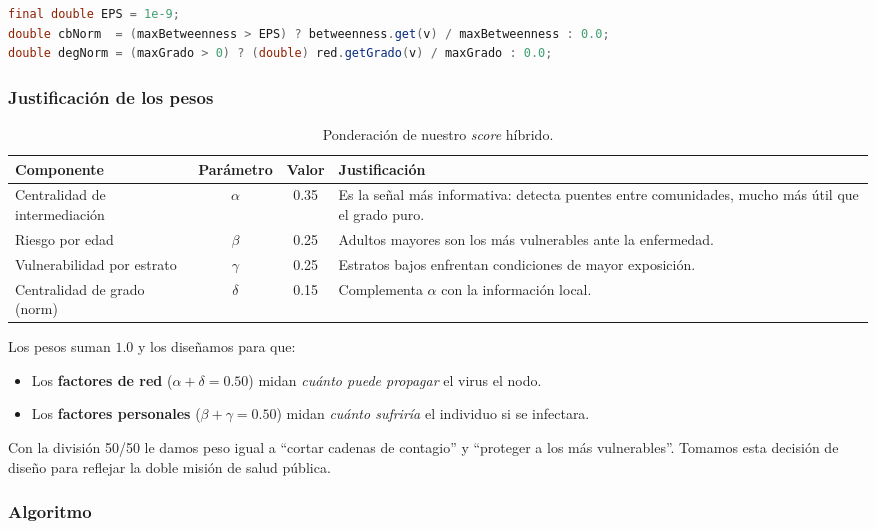 \documentclass[spanish,notitlepage,letterpaper, 12pt]{article}
\begin{document}
\begin{lstlisting}[language=Java, caption={Normalizaci\'on con protecci\'on ante divisi\'on por cero.}]
final double EPS = 1e-9;
double cbNorm  = (maxBetweenness > EPS) ? betweenness.get(v) / maxBetweenness : 0.0;
double degNorm = (maxGrado > 0) ? (double) red.getGrado(v) / maxGrado : 0.0;
\end{lstlisting}

\subsubsection{Justificaci\'on de los pesos}

\begin{table}[H]
\centering
\caption{Ponderaci\'on de nuestro \textit{score} h\'ibrido.}
\label{tab:pesos_hibrida}
\begin{tabular}{l c c p{5cm}}
\toprule
\textbf{Componente} & \textbf{Par\'ametro} & \textbf{Valor} & \textbf{Justificaci\'on} \\
\midrule
Centralidad de intermediaci\'on & $\alpha$ & 0.35 & Es la se\~nal m\'as informativa: detecta puentes entre comunidades, mucho m\'as \'util que el grado puro. \\
Riesgo por edad & $\beta$ & 0.25 & Adultos mayores son los m\'as vulnerables ante la enfermedad. \\
Vulnerabilidad por estrato & $\gamma$ & 0.25 & Estratos bajos enfrentan condiciones de mayor exposici\'on. \\
Centralidad de grado (norm) & $\delta$ & 0.15 & Complementa $\alpha$ con la informaci\'on local. \\
\bottomrule
\end{tabular}
\end{table}

Los pesos suman $1.0$ y los dise\~namos para que:
\begin{itemize}
    \item Los \textbf{factores de red} ($\alpha + \delta = 0.50$) midan \emph{cu\'anto puede propagar} el virus el nodo.
    \item Los \textbf{factores personales} ($\beta + \gamma = 0.50$) midan \emph{cu\'anto sufrir\'ia} el individuo si se infectara.
\end{itemize}
Con la divisi\'on 50/50 le damos peso igual a ``cortar cadenas de contagio'' y ``proteger a los m\'as vulnerables''. Tomamos esta decisi\'on de dise\~no para reflejar la doble misi\'on de salud p\'ublica.

\subsubsection{Algoritmo}
\end{document}

